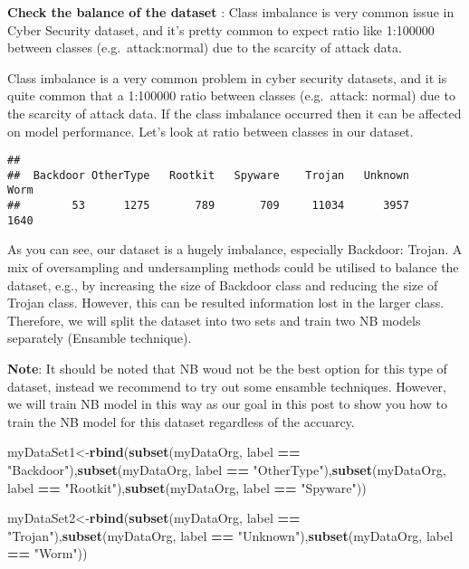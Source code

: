 \documentclass[]{article}
\newenvironment{Shaded}{\begin{snugshade}}{\end{snugshade}}
\newcommand{\KeywordTok}[1]{\textcolor[rgb]{0.13,0.29,0.53}{\textbf{#1}}}
\newcommand{\NormalTok}[1]{#1}
\newcommand{\OperatorTok}[1]{\textcolor[rgb]{0.81,0.36,0.00}{\textbf{#1}}}
\newcommand{\StringTok}[1]{\textcolor[rgb]{0.31,0.60,0.02}{#1}}
\begin{document}
\textbf{Check the balance of the dataset} : Class imbalance is very
common issue in Cyber Security dataset, and it's pretty common to expect
ratio like 1:100000 between classes (e.g.~attack:normal) due to the
scarcity of attack data.

Class imbalance is a very common problem in cyber security datasets, and
it is quite common that a 1:100000 ratio between classes (e.g.~attack:
normal) due to the scarcity of attack data. If the class imbalance
occurred then it can be affected on model performance. Let's look at
ratio between classes in our dataset.

\begin{Shaded}
\end{Shaded}

\begin{verbatim}
## 
##  Backdoor OtherType   Rootkit   Spyware    Trojan   Unknown      Worm 
##        53      1275       789       709     11034      3957      1640
\end{verbatim}

As you can see, our dataset is a hugely imbalance, especially Backdoor:
Trojan. A mix of oversampling and undersampling methods could be
utilised to balance the dataset, e.g., by increasing the size of
Backdoor class and reducing the size of Trojan class. However, this can
be resulted information lost in the larger class. Therefore, we will
split the dataset into two sets and train two NB models separately
(Ensamble technique).

\textbf{Note}: It should be noted that NB woud not be the best option
for this type of dataset, instead we recommend to try out some ensamble
techniques. However, we will train NB model in this way as our goal in
this post to show you how to train the NB model for this dataset
regardless of the accuarcy.

\begin{Shaded}
\begin{Highlighting}[]
\NormalTok{myDataSet1<-}\KeywordTok{rbind}\NormalTok{(}\KeywordTok{subset}\NormalTok{(myDataOrg, label }\OperatorTok{==}\StringTok{ "Backdoor"}\NormalTok{),}\KeywordTok{subset}\NormalTok{(myDataOrg, label }\OperatorTok{==}\StringTok{ "OtherType"}\NormalTok{),}\KeywordTok{subset}\NormalTok{(myDataOrg, label }\OperatorTok{==}\StringTok{ "Rootkit"}\NormalTok{),}\KeywordTok{subset}\NormalTok{(myDataOrg, label }\OperatorTok{==}\StringTok{ "Spyware"}\NormalTok{))}

\NormalTok{myDataSet2<-}\KeywordTok{rbind}\NormalTok{(}\KeywordTok{subset}\NormalTok{(myDataOrg, label }\OperatorTok{==}\StringTok{ "Trojan"}\NormalTok{),}\KeywordTok{subset}\NormalTok{(myDataOrg, label }\OperatorTok{==}\StringTok{ "Unknown"}\NormalTok{),}\KeywordTok{subset}\NormalTok{(myDataOrg, label }\OperatorTok{==}\StringTok{ "Worm"}\NormalTok{))}
\end{Highlighting}
\end{Shaded}
\end{document}
